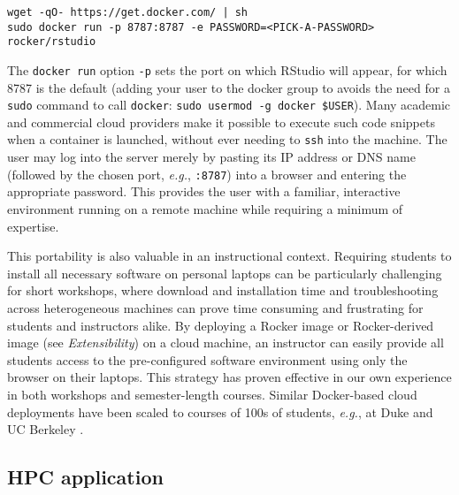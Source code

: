 \begin{verbatim}
wget -qO- https://get.docker.com/ | sh 
sudo docker run -p 8787:8787 -e PASSWORD=<PICK-A-PASSWORD> rocker/rstudio
\end{verbatim}

The \texttt{docker\ run} option \texttt{-p} sets the port on which
RStudio\textsuperscript{\textregistered} will appear, for which 8787 is
the default (adding your user to the docker group to avoids the need for
a \texttt{sudo} command to call \texttt{docker}:
\texttt{sudo\ usermod\ -g\ docker\ \$USER}). Many academic and
commercial cloud providers make it possible to execute such code
snippets when a container is launched, without ever needing to
\texttt{ssh} into the machine. The user may log into the server merely
by pasting its IP address or DNS name (followed by the chosen port,
\emph{e.g.}, \texttt{:8787}) into a browser and entering the appropriate
password. This provides the user with a familiar, interactive
environment running on a remote machine while requiring a minimum of
expertise.

This portability is also valuable in an instructional context. Requiring
students to install all necessary software on personal laptops can be
particularly challenging for short workshops, where download and
installation time and troubleshooting across heterogeneous machines can
prove time consuming and frustrating for students and instructors alike.
By deploying a Rocker image or Rocker-derived image (see
\emph{Extensibility}) on a cloud machine, an instructor can easily
provide all students access to the pre-configured software environment
using only the browser on their laptops. This strategy has proven
effective in our own experience in both workshops and semester-length
courses. Similar Docker-based cloud deployments have been scaled to
courses of 100s of students, \emph{e.g.}, at Duke \citep{Mine} and UC
Berkeley \citep{data8}.

\subsection{HPC application}\label{hpc-application}

